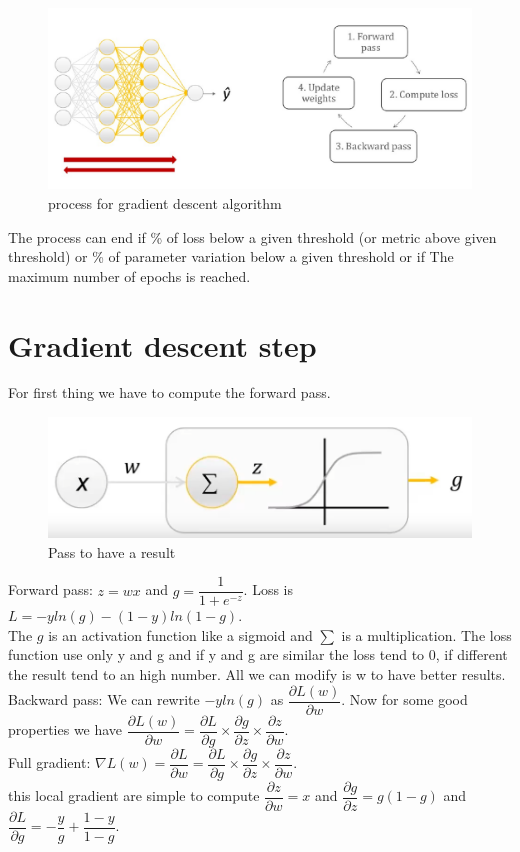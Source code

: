 \begin{figure}[H]
    \centering
    \includegraphics[scale=0.3]{images/artN/artn3.png}
    \caption{process for gradient descent algorithm}
    \label{fig:enter-label}
\end{figure}
 The process can end if \% of loss below a given threshold (or metric above given threshold) or \% of parameter variation below a given threshold or if The maximum number of epochs is reached.
 \section{Gradient descent step}
 For first thing we have to compute the forward pass.
 \begin{figure}[H]
     \centering
     \includegraphics[scale=0.3]{images/artN/artn4.png}
     \caption{Pass to have a result}
     \label{fig:enter-label}
 \end{figure}
Forward pass:
$z = wx$ and $g= \dfrac{1}{1+e^{-z}}$. Loss is $L= -y ln(g) - (1 -y) ln(1-g)$.\\
The $g$ is an activation function like a sigmoid and $\sum$ is a multiplication. The loss function use only y and g and if y and g are similar the loss tend to 0, if different the result tend to an high number. All we can modify is w to have better results.\\
Backward pass: 
We can rewrite $-y ln(g)$ as $ \dfrac{\partial L(w)}{\partial w} $. Now for some good properties we have $\dfrac{\partial L(w)}{\partial w} = \dfrac{\partial L}{\partial g} \times \dfrac{\partial g}{\partial z} \times \dfrac{\partial z}{\partial w}$.\\
Full gradient: $ \nabla L(w) = \dfrac{\partial L}{\partial w} = \dfrac{\partial L}{\partial g} \times \dfrac{\partial g}{\partial z} \times \dfrac{\partial z}{\partial w}$.\\
this local gradient are simple to compute $\dfrac{\partial z}{\partial w} = x $ and $ \dfrac{\partial g}{\partial z} = g(1-g) $ and $\dfrac{\partial L}{\partial g} = - \dfrac{y}{g}+ \dfrac{1-y}{1-g} $.\\

